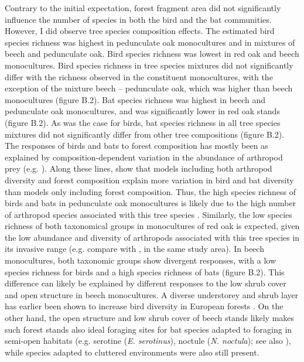\documentclass[10pt, twoside]{book} %
\begin{document}
Contrary to the initial expectation, forest fragment area did not significantly influence the number of species in both the bird and the bat communities. However, I did observe tree species composition effects. The estimated bird species richness was highest in pedunculate oak monocultures and in mixtures of beech and pedunculate oak. Bird species richness was lowest in red oak and beech monocultures. Bird species richness in tree species mixtures did not significantly differ with the richness observed in the constituent monocultures, with the exception of the mixture beech -- pedunculate oak, which was higher than beech monocultures (figure B.2). Bat species richness was highest in beech and pedunculate oak monocultures, and was significantly lower in red oak stands (figure B.2). As was the case for birds, bat species richness in all tree species mixtures did not significantly differ from other tree compositions (figure B.2).\\

The responses of birds and bats to forest composition has mostly been as explained by composition-dependent variation in the abundance of arthropod prey (e.g. \citealt{Charbonnier2016, Penone2019}). Along these lines, \citet{Barbaro2019} show that models including both arthropod diversity and forest composition explain more variation in bird and bat diversity than models only including forest composition. Thus, the high species richness of birds and bats in pedunculate oak monocultures is likely due to the high number of arthropod species associated with this tree species \citep{Kennedy1984, Brandle2001}. Similarly, the low species richness of both taxonomical groups in monocultures of red oak is expected, given the low abundance and diversity of arthropods associated with this tree species in its invasive range (e.g. compare with \citealt{VanSchrojensteinLantman2020}, in the same study area). In beech monocultures, both taxonomic groups show divergent responses, with a low species richness for birds and a high species richness of bats (figure B.2). This difference can likely be explained by different responses to the low shrub cover and open structure in beech monocultures. A diverse understorey and shrub layer has earlier been shown to increase bird diversity in European forests \citep{Renner2018, Penone2019}. On the other hand, the open structure and low shrub cover of beech stands likely makes such forest stands also ideal foraging sites for bat species adapted to foraging in semi-open habitats (e.g. serotine (\textit{E. serotinus}), noctule (\textit{N. noctula}); see also \citealt{Fuentes-Montemayor2013}), while species adapted to cluttered environments were also still present.\\
\end{document}
